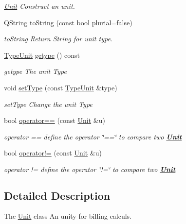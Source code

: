 \begin{DoxyCompactItemize}
\begin{DoxyCompactList}\small\item\em \hyperlink{classModels_1_1Unit}{Unit} Construct an unit. \end{DoxyCompactList}\item 
Q\-String \hyperlink{classModels_1_1Unit_a0eeeb628ada11c3809e82634ea24e2a7}{to\-String} (const bool plurial=false)
\begin{DoxyCompactList}\small\item\em to\-String Return String for unit type. \end{DoxyCompactList}\item 
\hyperlink{namespaceModels_a999532b323a4b63ff54013326c83f040}{Type\-Unit} \hyperlink{classModels_1_1Unit_aa7aa58c11b9464c99595ccc755fcf7c6}{getype} () const 
\begin{DoxyCompactList}\small\item\em getype The unit Type \end{DoxyCompactList}\item 
void \hyperlink{classModels_1_1Unit_ad7e3209d943fb8ee06b5d132173710c5}{set\-Type} (const \hyperlink{namespaceModels_a999532b323a4b63ff54013326c83f040}{Type\-Unit} \&type)
\begin{DoxyCompactList}\small\item\em set\-Type Change the unit Type \end{DoxyCompactList}\item 
bool \hyperlink{classModels_1_1Unit_a4554ce9d88e0ded72688e8085f5feb3f}{operator==} (const \hyperlink{classModels_1_1Unit}{Unit} \&u)
\begin{DoxyCompactList}\small\item\em operator == define the operator \char`\"{}==\char`\"{} to compare two {\bfseries \hyperlink{classModels_1_1Unit}{Unit}} \end{DoxyCompactList}\item 
bool \hyperlink{classModels_1_1Unit_a3fda8038ee8876979b40895c6de7fc49}{operator!=} (const \hyperlink{classModels_1_1Unit}{Unit} \&u)
\begin{DoxyCompactList}\small\item\em operator != define the operator \char`\"{}!=\char`\"{} to compare two {\bfseries \hyperlink{classModels_1_1Unit}{Unit}} \end{DoxyCompactList}\end{DoxyCompactItemize}


\subsection{Detailed Description}
The \hyperlink{classModels_1_1Unit}{Unit} class An unity for billing calculs. 

